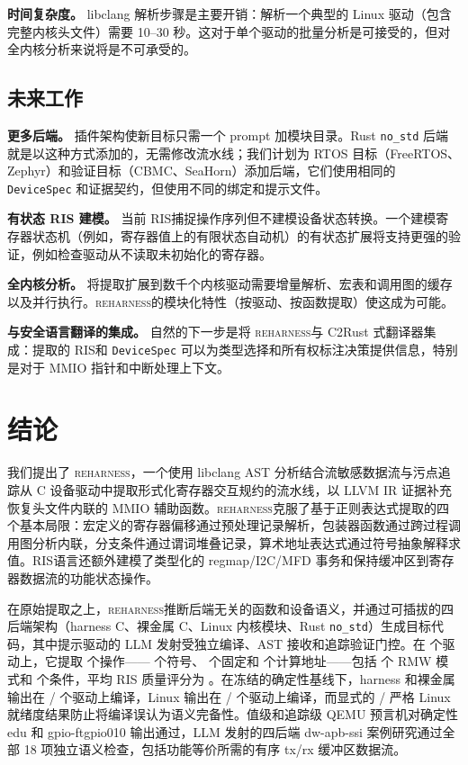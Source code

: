 \documentclass[sigplan, screen, review, anonymous]{acmart}
\newcommand{\reharness}{\textsc{reharness}}
\newcommand{\rislang}{RIS}
\begin{document}
\textbf{时间复杂度。} libclang 解析步骤是主要开销：解析一个典型的 Linux 驱动（包含完整内核头文件）需要 10--30 秒。这对于单个驱动的批量分析是可接受的，但对全内核分析来说将是不可承受的。

\subsection{未来工作}

\textbf{更多后端。} 插件架构使新目标只需一个 prompt 加模块目录。Rust \texttt{no\_std} 后端就是以这种方式添加的，无需修改流水线；我们计划为 RTOS 目标（FreeRTOS、Zephyr）和验证目标（CBMC、SeaHorn）添加后端，它们使用相同的 \texttt{DeviceSpec} 和证据契约，但使用不同的绑定和提示文件。

\textbf{有状态 RIS 建模。} 当前 \rislang 捕捉操作序列但不建模设备状态转换。一个建模寄存器状态机（例如，寄存器值上的有限状态自动机）的有状态扩展将支持更强的验证，例如检查驱动从不读取未初始化的寄存器。

\textbf{全内核分析。} 将提取扩展到数千个内核驱动需要增量解析、宏表和调用图的缓存以及并行执行。\reharness 的模块化特性（按驱动、按函数提取）使这成为可能。

\textbf{与安全语言翻译的集成。} 自然的下一步是将 \reharness 与 C2Rust 式翻译器集成：提取的 \rislang 和 \texttt{DeviceSpec} 可以为类型选择和所有权标注决策提供信息，特别是对于 MMIO 指针和中断处理上下文。

\section{结论}

我们提出了 \reharness，一个使用 libclang AST 分析结合流敏感数据流与污点追踪从 C 设备驱动中提取形式化寄存器交互规约的流水线，以 LLVM IR 证据补充恢复头文件内联的 MMIO 辅助函数。\reharness 克服了基于正则表达式提取的四个基本局限：宏定义的寄存器偏移通过预处理记录解析，包装器函数通过跨过程调用图分析内联，分支条件通过谓词堆叠记录，算术地址表达式通过符号抽象解释求值。\rislang 语言还额外建模了类型化的 regmap/I2C/MFD 事务和保持缓冲区到寄存器数据流的功能状态操作。

在原始提取之上，\reharness 推断后端无关的函数和设备语义，并通过可插拔的四后端架构（harness C、裸金属 C、Linux 内核模块、Rust \texttt{no\_std}）生成目标代码，其中提示驱动的 LLM 发射受独立编译、AST 接收和追踪验证门控。在 \EvalDrivers{} 个驱动上，它提取 \EvalOps{} 个操作——\EvalSymbolic{} 个符号、\EvalFixed{} 个固定和 \EvalComputed{} 个计算地址——包括 \EvalRMW{} 个 RMW 模式和 \EvalConditions{} 个条件，平均 RIS 质量评分为 \EvalMeanRIS{}。在冻结的确定性基线下，harness 和裸金属输出在 \HarnessCompileCount{}/\EvalDrivers{} 个驱动上编译，Linux 输出在 \LinuxCompileCount{}/\EvalDrivers{} 个驱动上编译，而显式的 \LinuxReadyCount{}/\EvalDrivers{} 严格 Linux 就绪度结果防止将编译误认为语义完备性。值级和追踪级 QEMU 预言机对确定性 edu 和 gpio-ftgpio010 输出通过，LLM 发射的四后端 dw-apb-ssi 案例研究通过全部 18 项独立语义检查，包括功能等价所需的有序 tx/rx 缓冲区数据流。
\end{document}

